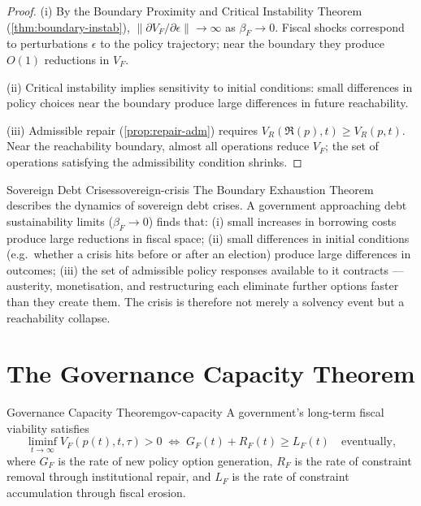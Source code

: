 \documentclass[12pt,twoside,openright]{book}
\newcommand{\repair}{\mathfrak{R}}
\begin{document}
\begin{proof}
  (i) By the Boundary Proximity and Critical Instability
  Theorem (\cref{thm:boundary-instab}),
  $\|\partial V_F/\partial\epsilon\| \to \infty$
  as $\beta_F \to 0$.
  Fiscal shocks correspond to perturbations $\epsilon$
  to the policy trajectory; near the boundary they
  produce $O(1)$ reductions in $V_F$.

  (ii) Critical instability implies sensitivity to
  initial conditions: small differences in policy
  choices near the boundary produce large differences
  in future reachability.

  (iii) Admissible repair (\cref{prop:repair-adm})
  requires $V_R(\repair(p), t) \ge V_R(p, t)$.
  Near the reachability boundary, almost all operations
  reduce $V_F$; the set of operations satisfying the
  admissibility condition shrinks.
\end{proof}

\begin{example}{Sovereign Debt Crises}{sovereign-crisis}
  The Boundary Exhaustion Theorem describes the
  dynamics of sovereign debt crises. A government
  approaching debt sustainability limits
  ($\beta_F \to 0$) finds that:
  (i) small increases in borrowing costs produce large
  reductions in fiscal space; (ii) small differences
  in initial conditions (e.g.\ whether a crisis hits
  before or after an election) produce large
  differences in outcomes; (iii) the set of admissible
  policy responses available to it contracts —
  austerity, monetisation, and restructuring each
  eliminate further options faster than they create them.
  The crisis is therefore not merely a solvency event
  but a reachability collapse.
\end{example}

\section{The Governance Capacity Theorem}

\begin{theorem}{Governance Capacity Theorem}{gov-capacity}
  A government's long-term fiscal viability satisfies
  \[
    \liminf_{t\to\infty} V_F(p(t), t, \tau) > 0
    \;\iff\;
    G_F(t) + R_F(t) \ge L_F(t)
    \quad \text{eventually},
  \]
  where $G_F$ is the rate of new policy option
  generation, $R_F$ is the rate of constraint removal
  through institutional repair, and $L_F$ is the rate
  of constraint accumulation through fiscal erosion.
\end{theorem}
\end{document}
